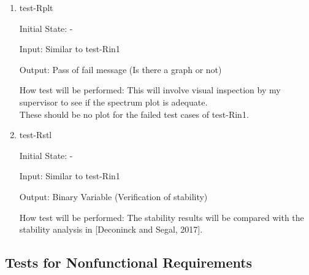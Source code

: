 \documentclass[12pt, titlepage]{article}
\begin{document}
\begin{enumerate}
\item{test-Rplt} 

Initial State: -

Input: Similar to test-Rin1 

Output: Pass of fail message (Is there a graph or not)

How test will be performed: This will involve visual inspection by my 
supervisor to see if the spectrum plot is adequate. \\
These should be no plot for the failed test cases of test-Rin1. 

\item{test-Rstl} 

Initial State: -

Input: Similar to test-Rin1 

Output: Binary Variable (Verification of stability) 

How test will be performed: The stability results will be compared with the 
stability analysis in [Deconinck and Segal, 2017]. 

\end{enumerate}

\subsection{Tests for Nonfunctional Requirements}
\end{document}
